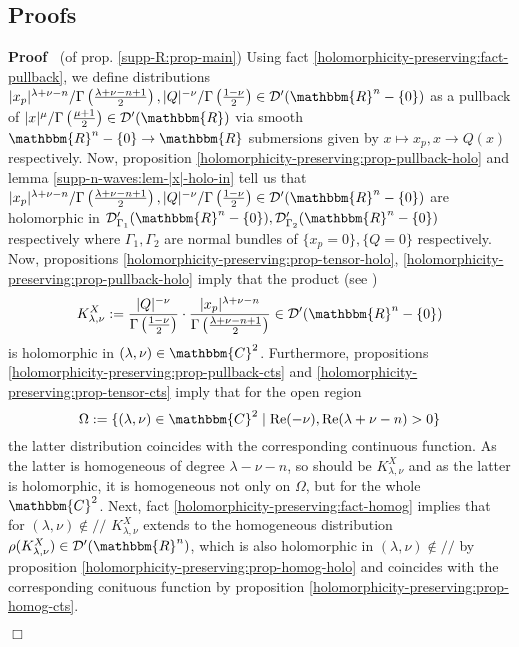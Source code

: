 \documentclass[12pt]{article}
\newcommand{\assign}{:=}
\newcommand{\nin}{\not\in}
\newcommand{\tmop}[1]{\ensuremath{\operatorname{#1}}}
\renewenvironment{proof}{\noindent\textbf{Proof\ }}{\hspace*{\fill}$\Box$\medskip}
\theoremstyle{remark}
\begin{document}
\subsection{Proofs}

\begin{proof}
  (of prop. \ref{supp-R:prop-main}) Using fact
  \ref{holomorphicity-preserving:fact-pullback}, we define distributions $|
  x_p |^{\lambda + \nu - n} / \Gamma \left( \frac{\lambda + \nu - n + 1}{2}
  \right), | Q |^{- \nu} / \Gamma \left( \frac{1 - \nu}{2} \right) \in
  \mathcal{D}' (\mathbbm{R}^n - \{ 0 \})$ as a pullback of $| x |^{\mu} /
  \Gamma \left( \frac{\mu + 1}{2} \right) \in \mathcal{D}' (\mathbbm{R})$ via
  smooth $\mathbbm{R}^n - \{ 0 \} \rightarrow \mathbbm{R}$ submersions given
  by $x \mapsto x_p, x \rightarrow Q (x)$ respectively. Now, proposition
  \ref{holomorphicity-preserving:prop-pullback-holo} and lemma
  \ref{supp-n-waves:lem-|x|-holo-in} tell us that $| x_p |^{\lambda + \nu - n}
  / \Gamma \left( \frac{\lambda + \nu - n + 1}{2} \right), | Q |^{- \nu} /
  \Gamma \left( \frac{1 - \nu}{2} \right) \in \mathcal{D}' (\mathbbm{R}^n - \{
  0 \})$ are holomorphic in $\mathcal{D}'_{\Gamma_1} (\mathbbm{R}^n - \{ 0
  \}), \mathcal{D}'_{\Gamma_2} (\mathbbm{R}^n - \{ 0 \})$ respectively where
  $\Gamma_1, \Gamma_2$ are normal bundles of $\{ x_p = 0 \}, \{ Q = 0 \}$
  respectively. Now, propositions
  \ref{holomorphicity-preserving:prop-tensor-holo},
  \ref{holomorphicity-preserving:prop-pullback-holo} imply that the product
  (see {\cite{hormander1983analysis}})
  \[ K_{\lambda, \nu}^X \assign \frac{| Q |^{- \nu}}{\Gamma \left( \frac{1 -
     \nu}{2} \right)} \cdot \frac{| x_p |^{\lambda + \nu - n}}{\Gamma \left(
     \frac{\lambda + \nu - n + 1}{2} \right)} \in \mathcal{D}' (\mathbbm{R}^n
     - \{ 0 \}) \]
  is holomorphic in $(\lambda, \nu) \in \mathbbm{C}^2$. Furthermore,
  propositions \ref{holomorphicity-preserving:prop-pullback-cts} and
  \ref{holomorphicity-preserving:prop-tensor-cts} imply that for the open
  region
  \[ \Omega \assign \{ (\lambda, \nu) \in \mathbbm{C}^2 \mid \tmop{Re} (-
     \nu), \tmop{Re} (\lambda + \nu - n) > 0 \} \]
  the latter distribution coincides with the corresponding continuous
  function. As the latter is homogeneous of degree $\lambda - \nu - n$, so
  should be $K_{\lambda, \nu}^X$ and as the latter is holomorphic, it is
  homogeneous not only on $\Omega$, but for the whole $\mathbbm{C}^2$. Next,
  fact \ref{holomorphicity-preserving:fact-homog} implies that for $(\lambda,
  \nu) \nin / /$ $K_{\lambda, \nu}^X$ extends to the homogeneous distribution
  $\rho (K_{\lambda, \nu}^X) \in \mathcal{D}' (\mathbbm{R}^n)$, which is also
  holomorphic in $(\lambda, \nu) \nin / /$ by proposition
  \ref{holomorphicity-preserving:prop-homog-holo} and coincides with the
  corresponding conituous function by proposition
  \ref{holomorphicity-preserving:prop-homog-cts}.
  

\end{proof}
\end{document}
